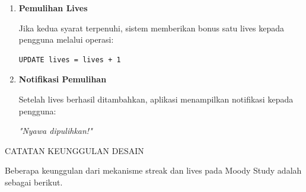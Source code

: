 \documentclass[11pt]{article}
\begin{document}
\begin{enumerate}
\begin{itemize}

\item Jumlah sesi belajar dalam satu hari minimal dua kali:

\begin{verbatim}
session_count >= 2
\end{verbatim}

\item Jumlah lives belum mencapai batas maksimum:

\begin{verbatim}
lives < 3
\end{verbatim}

\end{itemize}

\item \textbf{Pemulihan Lives}

Jika kedua syarat terpenuhi, sistem memberikan bonus satu lives kepada pengguna melalui operasi:

\begin{verbatim}
UPDATE lives = lives + 1
\end{verbatim}

\item \textbf{Notifikasi Pemulihan}

Setelah lives berhasil ditambahkan, aplikasi menampilkan notifikasi kepada pengguna:

\textit{"Nyawa dipulihkan!"}

\end{enumerate}

CATATAN KEUNGGULAN DESAIN

Beberapa keunggulan dari mekanisme streak dan lives pada Moody Study adalah sebagai berikut.
\end{document}
